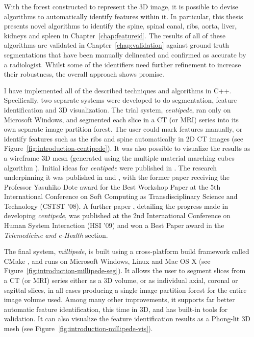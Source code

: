 With the forest constructed to represent the 3D image, it is possible to devise algorithms to automatically identify features within it. In particular, this thesis presents novel algorithms to identify the spine, spinal canal, ribs, aorta, liver, kidneys and spleen in Chapter~\ref{chap:featureid}. The results of all of these algorithms are validated in Chapter~\ref{chap:validation} against ground truth segmentations that have been manually delineated and confirmed as accurate by a radiologist. Whilst some of the identifiers need further refinement to increase their robustness, the overall approach shows promise.


I have implemented all of the described techniques and algorithms in C++. Specifically, two separate systems were developed to do segmentation, feature identification and 3D visualization. The trial system, \emph{centipede}, ran only on Microsoft Windows, and segmented each slice in a CT (or MRI) series into its own separate image partition forest. The user could mark features manually, or identify features such as the ribs and spine automatically in 2D CT images (see Figure~\ref{fig:introduction-centipede}). It was also possible to visualize the results as a wireframe 3D mesh (generated using the multiple material marching cubes algorithm \cite{wu03}). Initial ideas for \emph{centipede} were published in \cite{gvcfbit07}. The research underpinning it was published in \cite{gvccimi08} and \cite{gvcispa09}, with the former paper receiving the Professor Yasuhiko Dote award for the Best Workshop Paper at the 5th International Conference on Soft Computing as Transdisciplinary Science and Technology (CSTST '08). A further paper \cite{gvchsi09}, detailing the progress made in developing \emph{centipede}, was published at the 2nd International Conference on Human System Interaction (HSI '09) and won a Best Paper award in the \emph{Telemedicine and e-Health} section.

The final system, \emph{millipede}, is built using a cross-platform build framework called CMake \cite{cmake}, and runs on Microsoft Windows, Linux and Mac OS X (see Figure~\ref{fig:introduction-millipede-seg}). It allows the user to segment slices from a CT (or MRI) series either as a 3D volume, or as individual axial, coronal or sagittal slices, in all cases producing a single image partition forest for the entire image volume used. Among many other improvements, it supports far better automatic feature identification, this time in 3D, and has built-in tools for validation. It can also visualize the feature identification results as a Phong-lit 3D mesh (see Figure~\ref{fig:introduction-millipede-vis}).

